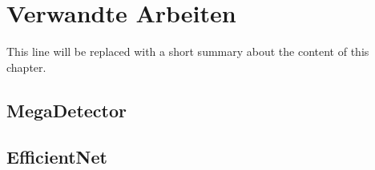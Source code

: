 \chapter{Verwandte Arbeiten}

This line will be replaced with a short summary about the content of this chapter.

\section{MegaDetector}

\section{EfficientNet}
